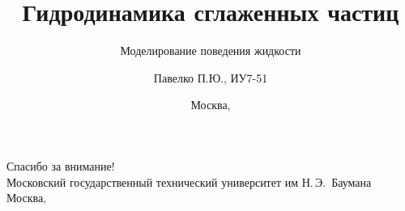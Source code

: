 \documentclass[hyperref={unicode}]{beamer}
\title{Гидродинамика сглаженных частиц}
\subtitle{Моделирование поведения жидкости}
\author{Павелко П.Ю., ИУ7-51}
\institute{МГТУ им. Баумана}
\date{Москва, \the\year}
\begin{document}
\begin{frame}
  \titlepage
\end{frame}




\begin{frame}[plain]
  \centering
  {\Huge Спасибо за внимание!}\\[2cm]

  {\Large Московский государственный технический университет им Н.\,Э.~Баумана}\\[1cm]

  {\large Москва, \the\year}
\end{frame}
\end{document}
